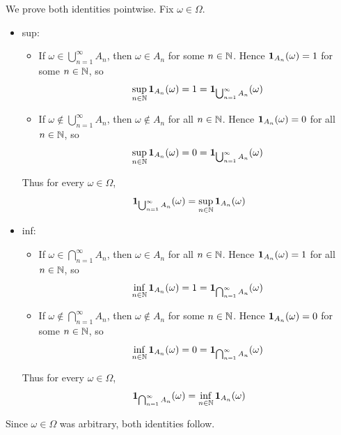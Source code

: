 \begin{solution}
\leavevmode
\begin{enumerate}[label={\protect\hyperref[exitem:indicators-limsup-liminf-sets:\arabic*]{(\roman*)}}]
\item \label{solitem:indicators-limsup-liminf-sets:1}
We prove both identities pointwise.
Fix $\omega \in \Omega$.
\begin{itemize}[leftmargin=*]
\item sup:
\begin{itemize}[leftmargin=*]
\item
If $\omega \in \bigcup_{n=1}^{\infty} A_n$, then $\omega \in A_n$ for some $n \in \mathbb{N}$.
Hence $\mathbf{1}_{A_n}(\omega)=1$ for some $n \allowbreak \in \allowbreak \mathbb{N}$, so
\[
\sup_{n \in \mathbb{N}}\mathbf{1}_{A_n}(\omega)=1
=
\mathbf{1}_{\bigcup_{n=1}^{\infty} A_n}(\omega)
\]
\item
If $\omega \notin \bigcup_{n=1}^{\infty} A_n$, then $\omega \notin A_n$ for all $n \in \mathbb{N}$.
Hence $\mathbf{1}_{A_n}(\omega)=0$ for all $n \allowbreak \in \allowbreak \mathbb{N}$, so
\[
\sup_{n \in \mathbb{N}}\mathbf{1}_{A_n}(\omega)=0
=
\mathbf{1}_{\bigcup_{n=1}^{\infty} A_n}(\omega)
\]
\end{itemize}
Thus for every $\omega \in \Omega$,
\[
\mathbf{1}_{\bigcup_{n=1}^{\infty} A_n}(\omega)
=
\sup_{n \in \mathbb{N}}\mathbf{1}_{A_n}(\omega)
\]

\item inf:
\begin{itemize}[leftmargin=*]
\item
If $\omega \in \bigcap_{n=1}^{\infty} A_n$, then $\omega \in A_n$ for all $n \in \mathbb{N}$.
Hence $\mathbf{1}_{A_n}(\omega)=1$ for all $n \allowbreak \in \allowbreak \mathbb{N}$, so
\[
\inf_{n \in \mathbb{N}}\mathbf{1}_{A_n}(\omega)=1
=
\mathbf{1}_{\bigcap_{n=1}^{\infty} A_n}(\omega)
\]
\item
If $\omega \notin \bigcap_{n=1}^{\infty} A_n$, then $\omega \notin A_n$ for some $n \in \mathbb{N}$.
Hence $\mathbf{1}_{A_n}(\omega)=0$ for some $n \allowbreak \in \allowbreak \mathbb{N}$, so
\[
\inf_{n \in \mathbb{N}}\mathbf{1}_{A_n}(\omega)=0
=
\mathbf{1}_{\bigcap_{n=1}^{\infty} A_n}(\omega)
\]
\end{itemize}
Thus for every $\omega \in \Omega$,
\[
\mathbf{1}_{\bigcap_{n=1}^{\infty} A_n}(\omega)
=
\inf_{n \in \mathbb{N}}\mathbf{1}_{A_n}(\omega)
\]
\end{itemize}

Since $\omega \in \Omega$ was arbitrary, both identities follow.


\end{enumerate}
\end{solution}
